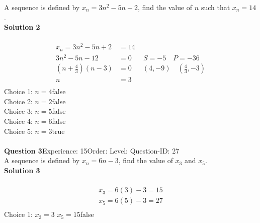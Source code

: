 \documentclass{article}
\begin{document}
A sequence is defined by $x_n=3n^2-5n+2$, find the value of $n$ such that $x_n=14$.\\[4pt]
\noindent\textbf{Solution 2}\\[2pt]
\\[-35pt]\begin{align*}
x_n=3n^2-5n+2&=14\\[2pt]
3n^2-5n-12&=0 \hspace{20pt} S=-5 \quad P=-36\\[2pt]
\left(n+\displaystyle\frac{4}{3}\right)(n-3)&=0 \hspace{19pt} (4,-9) \quad \left(\displaystyle\frac{4}{3},-3\right)\\[2pt]
n&=3\\
\end{align*}
Choice 1: \hspace{20pt}$n=4$\hspace{20pt}false\\
Choice 2: \hspace{20pt}$n=2$\hspace{20pt}false\\
Choice 3: \hspace{20pt}$n=5$\hspace{20pt}false\\
Choice 4: \hspace{20pt}$n=6$\hspace{20pt}false\\
Choice 5: \hspace{20pt}$n=3$\hspace{20pt}true\\
\\[4pt]
\noindent\textbf{Question 3}\hspace{20pt}Experience: 15\hspace{20pt}Order: \hspace{20pt}Level: \hspace{20pt}Question-ID: 27\\[2pt]
A sequence is defined by $x_n=6n-3$, find the value of $x_3$ and $x_5$.\\[4pt]
\noindent\textbf{Solution 3}\\[2pt]
\\[-35pt]\begin{align*}
x_3=6(3)-3=15\\[2pt]
x_5=6(5)-3=27\\[2pt]
\end{align*}
Choice 1: \hspace{20pt}$x_3=3 \,\, x_5=15$\hspace{20pt}false\\
\end{document}
